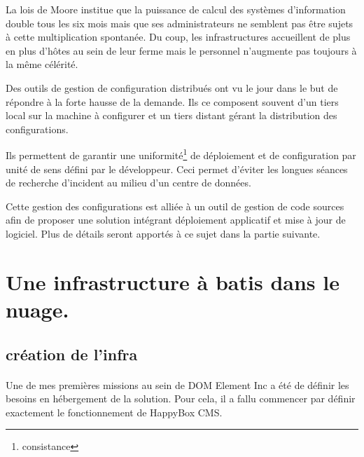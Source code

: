 \documentclass[11pt, a4paper ]{article}
\let\stdsection\section
\renewcommand\section{\newpage\stdsection}
\begin{document}
\begin{spacing}{1.5}
La lois de Moore institue que la puissance de calcul des systèmes d'information double tous les six mois mais que ses administrateurs ne semblent pas être sujets à cette multiplication spontanée. Du coup, les infrastructures accueillent de plus en plus d'hôtes au sein de leur ferme mais le personnel n'augmente pas toujours à la même célérité.

Des outils de gestion de configuration distribués ont vu le jour dans le but de répondre à la forte hausse de la demande. Ils ce composent souvent d'un tiers local sur la machine à configurer et un tiers distant gérant la distribution des configurations.

Ils permettent de garantir une uniformité\footnote{consistance} de déploiement et de configuration par unité de sens défini par le développeur. Ceci permet d'éviter les longues séances de recherche d'incident au milieu d'un centre de données.

Cette gestion des configurations est alliée à un outil de gestion de code sources afin de proposer une solution intégrant déploiement applicatif et mise à jour de logiciel. Plus de détails seront apportés à ce sujet dans la partie suivante.


\section{Une infrastructure à batis dans le nuage.}	 %


	\subsection{création de l'infra} %

\paragraph{}
Une de mes premières missions au sein de DOM Element Inc a été de définir les besoins en hébergement de la solution. Pour cela, il a fallu commencer par définir exactement le fonctionnement de HappyBox CMS.


\end{spacing}
\end{document}
